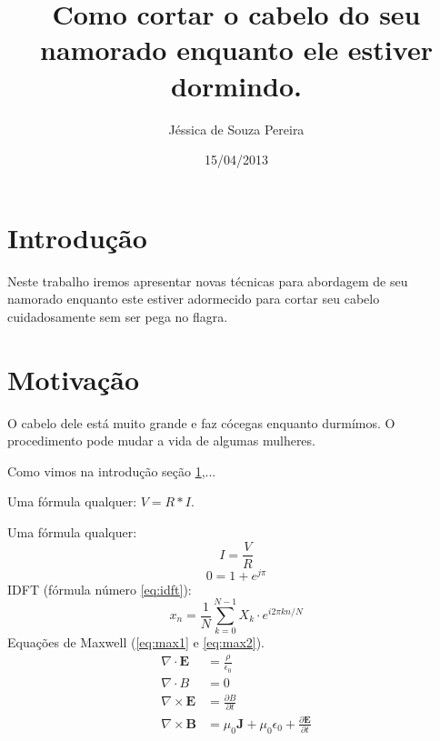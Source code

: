 \documentclass{article}
\author{Jéssica de Souza Pereira}
\date{15/04/2013}
\title{Como cortar o cabelo do seu namorado enquanto ele estiver dormindo.}
\newcommand{\vetor}[1]{\textbf{#1}}
\begin{document}
\maketitle
\newpage
\section{Introdução}
\label{sec:intro}
Neste trabalho iremos apresentar novas técnicas para abordagem de seu namorado enquanto este estiver adormecido para cortar seu cabelo cuidadosamente sem ser pega no flagra.
\section{Motivação}
\label{sec:motiv}
O cabelo dele está muito grande e faz cócegas enquanto durmímos. O procedimento pode mudar a vida de algumas mulheres.

Como vimos na introdução {seção \ref{sec:intro}},...

Uma fórmula qualquer: $V = R*I$.

\hfill

Uma fórmula qualquer: $$I = \frac{V}{R}$$
$$0=1+e^{j\pi}$$
IDFT (fórmula número \ref{eq:idft}):
\begin{equation}
\label{eq:idft}
x_n = \frac{1}{N}\sum_{k = 0}^{N-1} X_k \cdot e^{i2\pi kn/N}
\end{equation}
Equações de Maxwell (\ref{eq:max1} e \ref{eq:max2}).
\begin{align}
\label{eq:max1}
\nabla \cdot \vetor{E} & = \frac{\rho}{\epsilon_0} \\
\label{eq:max2}
\nabla \cdot B & = 0 \\
\label{eq:max3}
\nabla \times \vetor{E} & = \frac{\partial B}{\partial t}\\
\label{eq:max4}
\nabla \times \vetor{B} & = \mu_0\vetor{J} + \mu_0 \epsilon_0 + \frac{\partial \vetor{E}}{\partial t}
\end{align}
\end{document}
